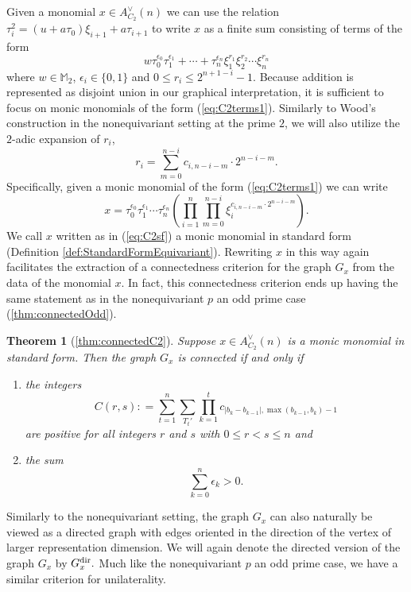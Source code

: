 \documentclass{amsart}
\newtheorem*{thm*}{Theorem}
\theoremstyle{definition}
\theoremstyle{plain}
\numberwithin{theorem}{section}
\numberwithin{equation}{section}
\numberwithin{figure}{section}
\newcommand{\mM}{{\mathbb M}}
\newcommand{\0}{\langle 0 \rangle }
\begin{document}
Given a monomial $x \in A_{C_2}^\vee (n)$ we can use the relation $\tau_i^2=(u+a\tau_0)\xi_{i+1}+a\tau_{i+1}$ to write $x$ as a finite sum consisting of terms of the form
\begin{equation} \label{eq:C2terms1}
w \tau_0^{\epsilon_0} \tau_1^{\epsilon_1} + \cdots + \tau_n^{\epsilon_n} \xi_1^{r_1} \xi_2^{r_2} \cdots \xi_n^{{r_n}}
\end{equation}
where $w \in \mM_2$, $\epsilon_i \in \{0,1\}$ and $0 \leq r_i \leq 2^{n + 1 - i} - 1$. Because addition is represented as disjoint union in our graphical interpretation, it is sufficient to focus on monic monomials of the form (\ref{eq:C2terms1}). Similarly to Wood's construction in the nonequivariant setting at the prime $2$, we will also utilize the $2$-adic expansion of $r_i$,
\[
r_i = \sum_{m  = 0}^{n - i} c_{i, n - i-m} \cdot 2^{n - i - m}.
\]
Specifically, given a monic monomial of the form (\ref{eq:C2terms1}) we can write 
\begin{equation} \label{eq:C2sf}
x = \tau_0^{\epsilon_0} \tau_1^{\epsilon_1} \cdots \tau_n^{\epsilon_n} \left(\prod_{i = 1}^n \prod_{m = 0}^{n - i} \xi_i^{c_{i, n - i -m} \cdot 2^{n - i - m}} \right).
\end{equation}
We call $x$ written as in (\ref{eq:C2sf}) a monic monomial in standard form (Definition \ref{def:StandardFormEquivariant}). 
Rewriting $x$ in this way again facilitates the extraction of a connectedness criterion for the graph $G_x$ from the data of the monomial $x$. In fact, this connectedness criterion ends up having the same statement as in the nonequivariant $p$ an odd prime case (\cref{thm:connectedOdd}). 
\begin{thm*}[\cref{thm:connectedC2}]
    Suppose $x \in A_{C_2}^\vee(n)$ is a monic monomial { in standard form}. Then the graph $G_x$ is connected if and only if 
    \begin{enumerate}
        \item the integers 
        \[
        C(r,s) : = \sum_{t = 1}^n \sum_{T_t'} \prod_{k = 1}^t c_{|b_k-b_{k-1}|, \max (b_{k-1}, b_k)-1} 
        \]
        are positive for all integers $r$ and $s$ with $0 \leq r < s \leq n$ and
        \item the sum 
        \[
        \sum_{k=0}^n \epsilon_k > 0.
        \]
    \end{enumerate}
\end{thm*}

Similarly to the nonequivariant setting, the graph $G_x$ can also naturally be viewed as a directed graph with edges oriented in the direction of the vertex of larger representation dimension. We will again denote the directed version of the graph $G_x$ by $G^\textup{dir}_x.$ Much like the nonequivariant $p$ an odd prime case, we have a similar criterion for unilaterality. 
\end{document}
